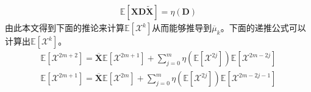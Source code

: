 \documentclass[bachelor,nocolorlinks, printoneside]{seuthesis} %
\begin{document}
\begin{Main}
\begin{eqnarray}
\mathbb{E}[\mathbf{X}\mathbf{D}\tilde{\mathbf{X}}] = \eta(\mathbf{D})
\end{eqnarray}
由此本文得到下面的推论来计算$\mathbb{E}[\mathcal{X}^k]$从而能够推导到$\overline{\mu}_k$。下面的递推公式可以计算出$\mathbb{E}[\mathcal{X}^k]$。
\begin{eqnarray}\label{key}
\mathbb{E}[\mathcal{X}^{2m+2}]=\overline{\mathbf{X}}\mathbb{E}[\mathcal{X}^{2m+1}]+\sum_{j=0}^{m}\eta(\mathbb{E}[\mathcal{X}^{2j}])\mathbb{E}[\mathcal{X}^{2m-2j}]  \\
\mathbb{E}[\mathcal{X}^{2m+1}]=\overline{\mathbf{X}}\mathbb{E}[\mathcal{X}^{2m}]+\sum_{j=0}^{m}\eta(\mathbb{E}[\mathcal{X}^{2j}])\mathbb{E}[\mathcal{X}^{2m-2j-1}] 
\end{eqnarray}











\end{Main} %



%



\newpage
\printindex %



%
%
\end{document}
